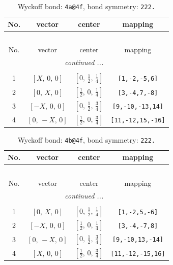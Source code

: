 \documentclass[fleqn,8pt]{jsarticle}
\begin{document}
\begin{longtable}{cccc}
\caption{Wyckoff bond: {\tt 4a@4f}, bond symmetry: {\tt 222.}}
 \\
 \hline \hline
No. & vector & center & mapping \\ \hline \endfirsthead

\multicolumn{3}{l}{\tablename\ \thetable{}} \\
 \hline \hline
No. & vector & center & mapping \\ \hline \endhead

 \hline \hline
\multicolumn{3}{r}{\footnotesize\it continued ...} \\ \endfoot

 \hline \hline
\multicolumn{3}{r}{} \\ \endlastfoot

1 & $\left[ X,\, 0,\, 0 \right]$ & $\left[ 0,\, \frac{1}{2},\, \frac{1}{4} \right]$ & {\tt [1,-2,-5,6]} \\ \hline
2 & $\left[ 0,\, X,\, 0 \right]$ & $\left[ \frac{1}{2},\, 0,\, \frac{1}{4} \right]$ & {\tt [3,-4,7,-8]} \\ \hline
3 & $\left[ - X,\, 0,\, 0 \right]$ & $\left[ 0,\, \frac{1}{2},\, \frac{3}{4} \right]$ & {\tt [9,-10,-13,14]} \\ \hline
4 & $\left[ 0,\, - X,\, 0 \right]$ & $\left[ \frac{1}{2},\, 0,\, \frac{3}{4} \right]$ & {\tt [11,-12,15,-16]} \\
\end{longtable}
\renewcommand{\arraystretch}{1.2}
\begin{longtable}{cccc}
\caption{Wyckoff bond: {\tt 4b@4f}, bond symmetry: {\tt 222.}}
 \\
 \hline \hline
No. & vector & center & mapping \\ \hline \endfirsthead

\multicolumn{3}{l}{\tablename\ \thetable{}} \\
 \hline \hline
No. & vector & center & mapping \\ \hline \endhead

 \hline \hline
\multicolumn{3}{r}{\footnotesize\it continued ...} \\ \endfoot

 \hline \hline
\multicolumn{3}{r}{} \\ \endlastfoot

1 & $\left[ 0,\, X,\, 0 \right]$ & $\left[ 0,\, \frac{1}{2},\, \frac{1}{4} \right]$ & {\tt [1,-2,5,-6]} \\ \hline
2 & $\left[ - X,\, 0,\, 0 \right]$ & $\left[ \frac{1}{2},\, 0,\, \frac{1}{4} \right]$ & {\tt [3,-4,-7,8]} \\ \hline
3 & $\left[ 0,\, - X,\, 0 \right]$ & $\left[ 0,\, \frac{1}{2},\, \frac{3}{4} \right]$ & {\tt [9,-10,13,-14]} \\ \hline
4 & $\left[ X,\, 0,\, 0 \right]$ & $\left[ \frac{1}{2},\, 0,\, \frac{3}{4} \right]$ & {\tt [11,-12,-15,16]} \\
\end{longtable}
\end{document}
